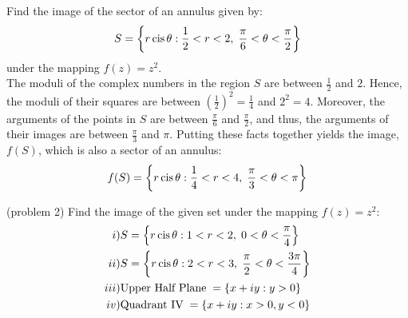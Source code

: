 \documentclass[handout]{ximera}
\begin{document}
\begin{example}[example 2]
Find the image of the sector of an annulus given by:
\[
S = \left\{r\operatorname{cis} \theta : \frac12 < r < 2, \;\frac{\pi}{6} < \theta < \frac{\pi}{2}\right\}
\]
under the mapping $f(z) = z^2$.\\
The moduli of the complex numbers in the region $S$ are between $\frac12$ and $2$. 
Hence, the moduli of their squares are between $\left(\tfrac12\right)^2 = \tfrac14$ and $2^2 = 4$. 
Moreover, the arguments of the points in $S$ are between $\tfrac{\pi}{6}$ and $\tfrac{\pi}{2}$, 
and thus, the arguments of their images are between $\tfrac{\pi}{3}$ and $\pi$. 
Putting these facts together yields the image, $f(S)$, which is also a sector of an annulus:
\[
f(S) = \left\{r\operatorname{cis} \theta : \frac14 < r < 4, \;\frac{\pi}{3} < \theta < \pi \right\}
\]


\begin{image}
\end{image}

\end{example}


\begin{problem}(problem 2)
Find the image of the given set under the mapping $f(z) = z^2$:
\begin{align*}
i) & S = \left\{r\operatorname{cis} \theta : 1 < r < 2, \;0 < \theta < \frac{\pi}{4}\right\} \\
ii) & S = \left\{r\operatorname{cis} \theta : 2 < r < 3, \;\frac{\pi}{2} < \theta < \frac{3\pi}{4}\right\}\\
iii) & \mbox{Upper Half Plane}\; = \left\{ x+iy: y> 0\right\}\\
iv) & \mbox{Quadrant IV}\; = \left\{ x+iy: x> 0, y< 0\right\}
\end{align*}
\end{problem}
\end{document}
